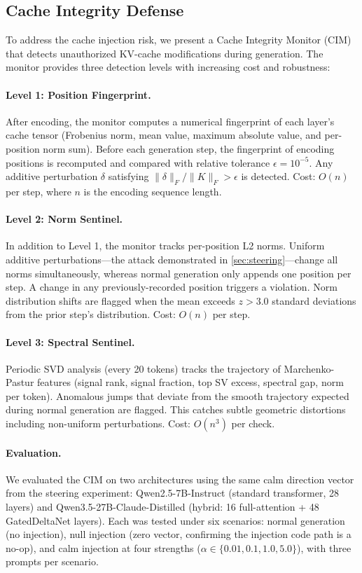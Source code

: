 \subsection{Cache Integrity Defense}\label{sec:cache_defense}

To address the cache injection risk, we present a Cache Integrity
Monitor (CIM) that detects unauthorized KV-cache modifications during
generation. The monitor provides three detection levels with increasing
cost and robustness:

\paragraph{Level 1: Position Fingerprint.}
After encoding, the monitor computes a numerical fingerprint of each
layer's cache tensor (Frobenius norm, mean value, maximum absolute
value, and per-position norm sum). Before each generation step, the
fingerprint of encoding positions is recomputed and compared with
relative tolerance $\epsilon = 10^{-5}$. Any additive perturbation
$\delta$ satisfying $\|\delta\|_F / \|K\|_F > \epsilon$ is detected.
Cost: $O(n)$ per step, where $n$ is the encoding sequence length.

\paragraph{Level 2: Norm Sentinel.}
In addition to Level 1, the monitor tracks per-position L2 norms.
Uniform additive perturbations---the attack demonstrated in
\cref{sec:steering}---change all norms simultaneously, whereas normal
generation only appends one position per step. A change in any
previously-recorded position triggers a violation. Norm distribution
shifts are flagged when the mean exceeds $z > 3.0$ standard deviations
from the prior step's distribution. Cost: $O(n)$ per step.

\paragraph{Level 3: Spectral Sentinel.}
Periodic SVD analysis (every 20 tokens) tracks the trajectory of
Marchenko-Pastur features (signal rank, signal fraction, top SV excess,
spectral gap, norm per token). Anomalous jumps that deviate from the
smooth trajectory expected during normal generation are flagged. This
catches subtle geometric distortions including non-uniform perturbations.
Cost: $O(n^3)$ per check.

\paragraph{Evaluation.}
We evaluated the CIM on two architectures using the same calm direction
vector from the steering experiment: Qwen2.5-7B-Instruct (standard
transformer, 28 layers) and Qwen3.5-27B-Claude-Distilled (hybrid: 16
full-attention + 48 GatedDeltaNet layers). Each was tested under six
scenarios: normal generation (no injection), null injection (zero vector,
confirming the injection code path is a no-op), and calm injection at four
strengths ($\alpha \in \{0.01, 0.1, 1.0, 5.0\}$), with three prompts per
scenario.

